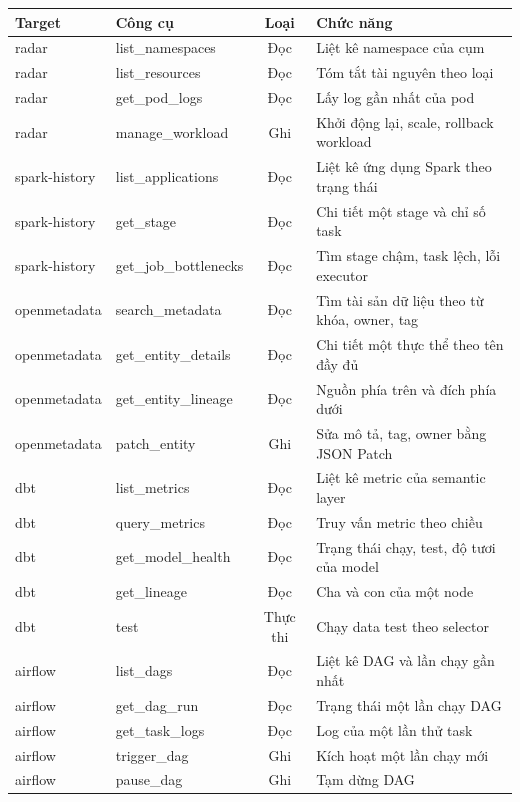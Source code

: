 {\singlespacing\renewcommand{\arraystretch}{1.2}\small
\begin{longtable}{|p{2.4cm}|p{3.8cm}|c|p{6.4cm}|}\hline
\textbf{Target} & \textbf{Công cụ} & \textbf{Loại} & \textbf{Chức năng} \\ \hline\endhead
radar & list\_namespaces & Đọc & Liệt kê namespace của cụm \\ \hline
radar & list\_resources & Đọc & Tóm tắt tài nguyên theo loại \\ \hline
radar & get\_pod\_logs & Đọc & Lấy log gần nhất của pod \\ \hline
radar & manage\_workload & Ghi & Khởi động lại, scale, rollback workload \\ \hline
spark-history & list\_applications & Đọc & Liệt kê ứng dụng Spark theo trạng thái \\ \hline
spark-history & get\_stage & Đọc & Chi tiết một stage và chỉ số task \\ \hline
spark-history & get\_job\_bottlenecks & Đọc & Tìm stage chậm, task lệch, lỗi executor \\ \hline
openmetadata & search\_metadata & Đọc & Tìm tài sản dữ liệu theo từ khóa, owner, tag \\ \hline
openmetadata & get\_entity\_details & Đọc & Chi tiết một thực thể theo tên đầy đủ \\ \hline
openmetadata & get\_entity\_lineage & Đọc & Nguồn phía trên và đích phía dưới \\ \hline
openmetadata & patch\_entity & Ghi & Sửa mô tả, tag, owner bằng JSON Patch \\ \hline
dbt & list\_metrics & Đọc & Liệt kê metric của semantic layer \\ \hline
dbt & query\_metrics & Đọc & Truy vấn metric theo chiều \\ \hline
dbt & get\_model\_health & Đọc & Trạng thái chạy, test, độ tươi của model \\ \hline
dbt & get\_lineage & Đọc & Cha và con của một node \\ \hline
dbt & test & Thực thi & Chạy data test theo selector \\ \hline
airflow & list\_dags & Đọc & Liệt kê DAG và lần chạy gần nhất \\ \hline
airflow & get\_dag\_run & Đọc & Trạng thái một lần chạy DAG \\ \hline
airflow & get\_task\_logs & Đọc & Log của một lần thử task \\ \hline
airflow & trigger\_dag & Ghi & Kích hoạt một lần chạy mới \\ \hline
airflow & pause\_dag & Ghi & Tạm dừng DAG \\ \hline
\end{longtable}}

